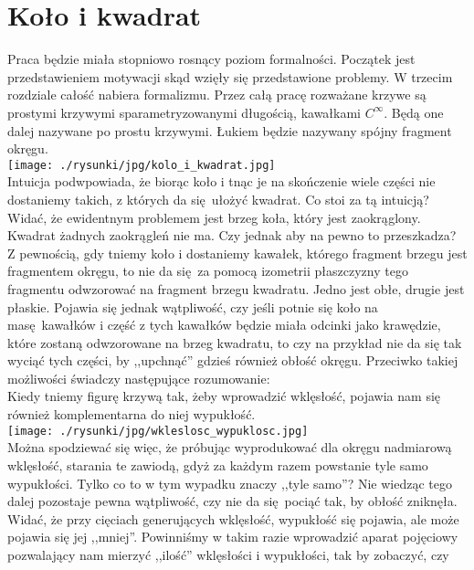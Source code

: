 \documentclass[a4paper, 12pt, twosided]{article}
\newcommand{\rysunek}[1]{\hfill \break\\[16pt] \Huge \textbf{\textcolor{violet}{Brakujący rysunek 
\normalsize
#1}} \hfill
\break \\[16pt] \normalsize}
\begin{document}
\section{Koło i kwadrat}
Praca będzie miała stopniowo rosnący poziom formalności. Początek jest 
przedstawieniem 
motywacji skąd wzięły się przedstawione problemy. W
trzecim rozdziale
całość nabiera formalizmu. Przez całą pracę rozważane krzywe są prostymi krzywymi 
 sparametryzowanymi 
długością,
 kawałkami $C^\infty$. Będą one dalej nazywane po prostu krzywymi. Łukiem będzie nazywany spójny
  fragment okręgu. \\[16pt]
\texttt{[image: ./rysunki/jpg/kolo\_i\_kwadrat.jpg]} \\
Intuicja podwpowiada, że biorąc koło i tnąc je na skończenie wiele części nie dostaniemy takich, z 
których
da się ułożyć kwadrat. Co stoi za tą intuicją? Widać, że ewidentnym problemem jest brzeg koła, 
 który 
jest
zaokrąglony. Kwadrat żadnych zaokrągleń nie ma. Czy jednak aby na pewno to przeszkadza? Z 
 pewnością, 
gdy
tniemy koło i dostaniemy kawałek, którego fragment brzegu jest fragmentem okręgu, to nie da się za 
pomocą
izometrii płaszczyzny tego fragmentu odwzorować na fragment brzegu kwadratu. Jedno jest obłe, 
 drugie 
jest
płaskie. Pojawia się jednak wątpliwość, czy jeśli potnie się koło na masę kawałków i część z tych 
kawałków
będzie miała odcinki jako krawędzie, które zostaną odwzorowane na brzeg kwadratu, to czy
 na przykład nie 
da się
tak wyciąć tych części, by ,,upchnąć'' gdzieś również obłość okręgu. Przeciwko takiej możliwości 
świadczy
następujące rozumowanie: \\
Kiedy tniemy figurę krzywą tak, żeby wprowadzić wklęsłość, pojawia nam się również komplementarna 
do niej
wypukłość. \\
\texttt{[image: ./rysunki/jpg/wkleslosc\_wypuklosc.jpg]} \\
Można spodziewać się więc, że próbując wyprodukować dla okręgu nadmiarową wklęsłość, starania te 
zawiodą,
gdyż za każdym razem powstanie tyle samo wypukłości. Tylko co to w tym wypadku znaczy ,,tyle samo''?
Nie wiedząc tego dalej pozostaje pewna wątpliwość, czy nie da się pociąć tak, by obłość zniknęła. 
Widać, że
przy cięciach generujących wklęsłość, wypukłość się pojawia, ale może pojawia się jej ,,mniej''. 
Powinniśmy w takim
razie wprowadzić aparat pojęciowy pozwalający nam mierzyć ,,ilość'' wklęsłości i wypukłości, tak by 
zobaczyć, czy
\end{document}
